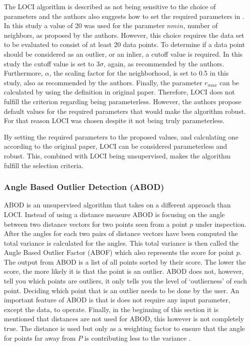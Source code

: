The LOCI algorithm is described as not being sensitive to the choice of parameters and the authors also suggests how to set the required parameters in \citep{papadimitriou2003loci}. In this study a value of 20 was used for the parameter $nmin$, number of neighbors, as proposed by the authors. However, this choice requires the data set to be evaluated to consist of at least 20 data points. To determine if a data point should be considered as an outlier, or an inlier, a cutoff value is required. In this study the cutoff value is set to $3\sigma$, again, as recommended by the authors. Furthermore, $\alpha$, the scaling factor for the neighborhood, is set to 0.5 in this study, also as recommended by the authors. Finally, the parameter $r_{max}$ can be calculated by using the definition in original paper. Therefore, LOCI does not fulfill the criterion regarding being parameterless. However, the authors propose default values for the required parameters that would make the algorithm robust. For that reason LOCI was chosen despite it not being truly parameterless. 


By setting the required parameters to the proposed values, and calculating one according to the original paper, LOCI can be considered parameterless and robust. This, combined with LOCI being unsupervised, makes the algorithm fulfill the selection criteria.




\subsubsection{Angle Based Outlier Detection (ABOD)}
ABOD is an unsupervised algorithm that takes on a different approach than LOCI\@. Instead of using a distance measure ABOD is focusing on the angle between two distance vectors for two points seen from a point $p$ under inspection. After the angles for each two pairs of distance vectors have been computed the total variance is calculated for the angles. This total variance is then called the Angle Based Outlier Factor (ABOF) which also represents the score for point $p$. The output from ABOD is a list of all points sorted by their score. The lower the score, the more likely it is that the point is an outlier. ABOD does not, however, tell you which points are outliers, it only tells you the level of `outlierness' of each point. Deciding which point that is an outlier needs to be done by the user. An important feature of ABOD is that is does not require any input parameter, except the data, to operate. Finally, in the beginning of this section it is mentioned that distances are not used for ABOD, this however is not completely true. The distance is used but only as a weighting factor to ensure that the angle for points far away from $P$ is contributing less to the variance \citep{kriegel2008angle}.


